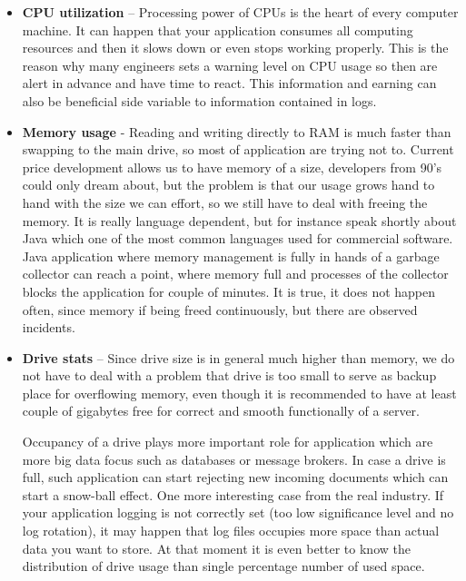 \begin{itemize}
    \item \textbf{CPU utilization} – Processing power of CPUs is the heart of every computer machine. It can happen that your application consumes all computing resources and then it slows down or even stops working properly. This is the reason why many engineers sets a warning level on CPU usage so then  are alert in advance and have time to react. This information and earning can also be beneficial side variable to information contained in logs.
    
    \item \textbf{Memory usage} - Reading and writing directly to RAM is much faster than swapping to the main drive, so most of application are trying not to. Current price development allows us to have memory of a size, developers from 90's could only dream about, but the problem is that our usage grows hand to hand with the size we can effort, so we still have to deal with freeing the memory. It is really language dependent, but for instance  speak shortly about Java\ms{,} which  one of the most common languages used for commercial software.  Java application where memory management is fully in hands of a garbage collector can reach a point, where memory  full and processes of the collector blocks the application for couple of minutes. It is true, it does not happen often, since memory if being freed continuously, but there are observed incidents.
    
    \item \textbf{Drive stats} – Since drive size is in general much higher than memory, we do not have to deal with a problem that drive is too small to serve as  backup place for overflowing memory, even though it is recommended to have at least couple of gigabytes free for correct and smooth functionally of a server. 
    
    Occupancy of a drive plays more important role for application which are more big data focus such as databases or message brokers. In case a drive is full, such application can start rejecting new incoming documents which can start a snow-ball effect. One more interesting case from the real industry. If your application logging is not correctly set (too low significance level and no log rotation), it may happen that log files occupies more space than actual data you want to store. At that moment it is even better to know the distribution of drive usage than single percentage number of used space.
    

\end{itemize}
